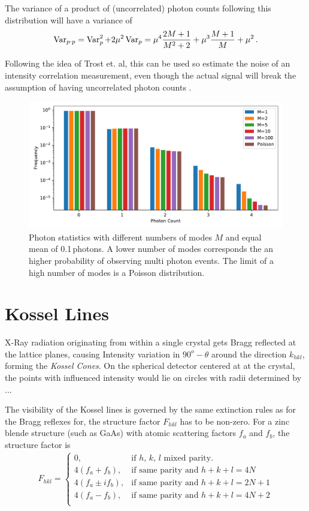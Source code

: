 The variance of a product of (uncorrelated) photon counts  following this distribution will have a variance of
\begin{equation}
\operatorname{Var}_{p\cdot p}= \operatorname{Var}_p^2 +2 \mu^2\operatorname{Var}_p	= \mu^4 \frac{2 M + 1}{M^2 + 2}+ \mu^3 \frac{M+1}{M} + \mu^2 \,.
\end{equation}

Following the idea of Trost et. al, this can be used so estimate the noise of an intensity correlation measurement, even though the actual signal will break the assumption of having uncorrelated photon counts \cite{trost2020}.
\begin{figure}
\centering
\includegraphics[width=0.6\linewidth]{images/modes.pdf}
\caption[Photon Statistics with different numbers of Modes]{Photon statistics with different numbers of modes $M$ and equal mean of 0.1\,photons. A lower number of modes corresponds the an higher probability of observing multi photon events. The limit of a high number of modes is a Poisson distribution.}
\end{figure}
\section{Kossel Lines}
X-Ray radiation originating from within a single crystal gets Bragg reflected at the lattice planes, causing Intensity variation in $90^o-\theta$ around the direction $k_{hkl}$, forming the \textit{Kossel Cones}. On the spherical detector centered at at the crystal, the points with influenced intensity would lie on circles with radii determined by ...

The visibility of the Kossel lines is governed by the same extinction rules as for the Bragg reflexes for, the structure factor $F_{hkl}$ has to be non-zero. For a zinc blende structure (such as GaAs) with atomic scattering factors $f_a$ and $f_b$, the structure factor is
\begin{align}
F_{hkl} = \begin{cases}
0, & \text{if $h$, $k$, $l$ mixed parity}.\\
4(f_a+f_b), & \text{if same parity and $h+k+l = 4 N$} \\
4(f_a\pm i f_b), & \text{if same parity and $h+k+l = 2 N+1$} \\
4(f_a-f_b), & \text{if same parity and $h+k+l = 4 N+2$} \\
\end{cases}
\end{align}

